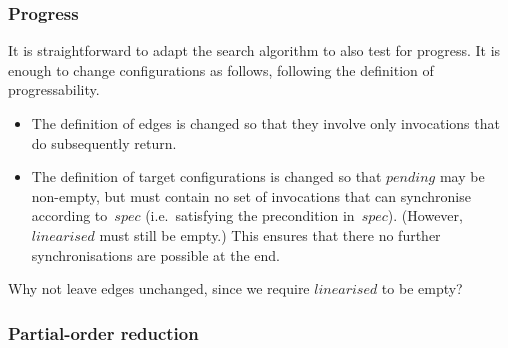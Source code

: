 
\subsubsection{Progress}

It is straightforward to adapt the search algorithm to also test for progress.
It is enough to change configurations as follows, following the definition of
progressability.
%
\begin{itemize}
\item The definition of  edges is changed so that they
  involve only invocations that do subsequently return.

\item The definition of target configurations is changed so that $pending$ may
  be non-empty, but must contain no set of invocations that can synchronise
  according to~$spec$ (i.e.~satisfying the precondition in~$spec$).  (However,
  $linearised$ must still be empty.)  This ensures that there no further
  synchronisations are possible at the end.
\end{itemize}

 Why not leave  edges unchanged, since
we require $linearised$ to be empty?


\subsubsection{Partial-order reduction}

